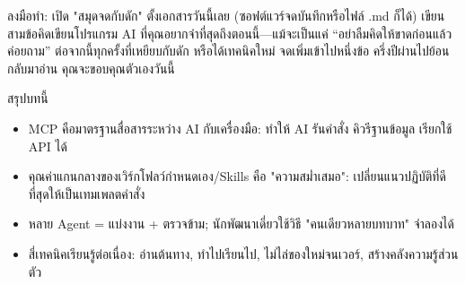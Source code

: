 \begin{tcbpractice}{ลงมือทำ: เปิด "สมุดจดกับดัก"}
ตั้งเอกสารวันนี้เลย (ซอฟต์แวร์จดบันทึกหรือไฟล์ .md ก็ได้) เขียนสามข้อคิดเขียนโปรแกรม AI ที่คุณอยากจำที่สุดถึงตอนนี้—แม้จะเป็นแค่ “อย่าลืมคิดให้ขาดก่อนแล้วค่อยถาม” ต่อจากนี้ทุกครั้งที่เหยียบกับดัก หรือได้เทคนิคใหม่ จดเพิ่มเข้าไปหนึ่งข้อ ครึ่งปีผ่านไปย้อนกลับมาอ่าน คุณจะขอบคุณตัวเองวันนี้

\end{tcbpractice}

\begin{tcbsummary}{สรุปบทนี้}
\begin{itemize}
  \item MCP คือมาตรฐานสื่อสารระหว่าง AI กับเครื่องมือ: ทำให้ AI รันคำสั่ง คิวรีฐานข้อมูล เรียกใช้ API ได้
  \item คุณค่าแกนกลางของเวิร์กโฟลว์กำหนดเอง/Skills คือ "ความสม่ำเสมอ": เปลี่ยนแนวปฏิบัติที่ดีที่สุดให้เป็นเทมเพลตคำสั่ง
  \item หลาย Agent = แบ่งงาน + ตรวจข้าม; นักพัฒนาเดี่ยวใช้วิธี "คนเดียวหลายบทบาท" จำลองได้
  \item สี่เทคนิคเรียนรู้ต่อเนื่อง: อ่านต้นทาง, ทำไปเรียนไป, ไม่ไล่ของใหม่จนเวอร์, สร้างคลังความรู้ส่วนตัว
\end{itemize}

\end{tcbsummary}
